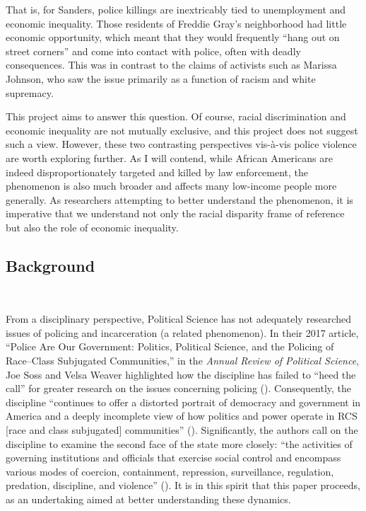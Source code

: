 \documentclass[12pt]{article}
\begin{document}
That is, for Sanders, police killings are inextricably tied to unemployment and economic inequality. Those residents of Freddie Gray's neighborhood had little economic opportunity, which meant that they would frequently “hang out on street corners” and come into contact with police, often with deadly consequences. This was in contrast to the claims of activists such as Marissa Johnson, who saw the issue primarily as a function of racism and white supremacy.

This project aims to answer this question. Of course, racial discrimination and economic inequality are not mutually exclusive, and this project does not suggest such a view. However, these two contrasting perspectives vis-à-vis police violence are worth exploring further. As I will contend, while African Americans are indeed disproportionately targeted and killed by law enforcement, the phenomenon is also much broader and affects many low-income people more generally. As researchers attempting to better understand the phenomenon, it is imperative that we understand not only the racial disparity frame of reference but also the role of economic inequality.

\subsection{Background}\

From a disciplinary perspective, Political Science has not adequately researched issues of policing and incarceration (a related phenomenon). In their 2017 article, “Police Are Our Government: Politics, Political Science, and the Policing of Race–Class Subjugated Communities,” in the \textit{Annual Review of Political Science}, Joe Soss and Velsa Weaver highlighted how the discipline has failed to “heed the call” for greater research on the issues concerning policing (\citeyear[568]{sossPoliceAreOur2017}). Consequently, the discipline “continues to offer a distorted portrait of democracy and government in America and a deeply incomplete view of how politics and power operate in RCS [race and class subjugated] communities” (\cite[568]{sossPoliceAreOur2017}). Significantly, the authors call on the discipline to examine the second face of the state more closely: ``the activities of governing institutions and officials that exercise social control and encompass various modes of coercion, containment, repression, surveillance, regulation, predation, discipline, and violence” (\cite[567]{sossPoliceAreOur2017}). It is in this spirit that this paper proceeds, as an undertaking aimed at better understanding these dynamics.
\end{document}
